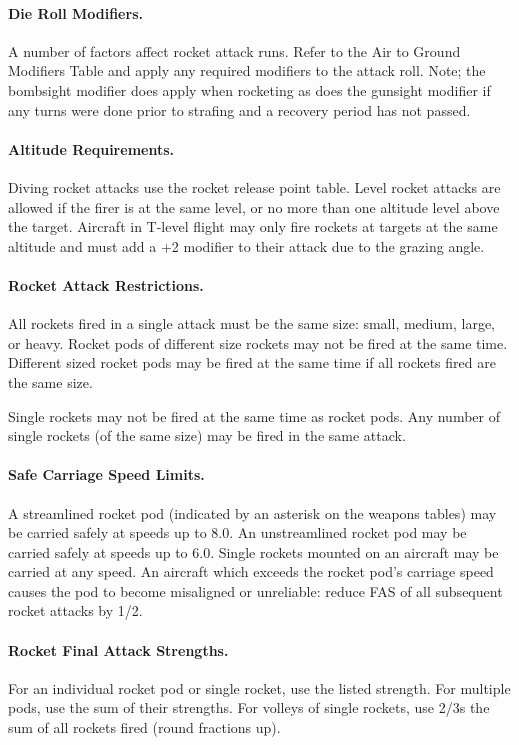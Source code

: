 \paragraph{Die Roll Modifiers.} A number of factors affect rocket attack runs. Refer to the Air to Ground Modifiers Table and apply any required modifiers to the attack roll. Note; the bombsight modifier does apply when rocketing as does the gunsight modifier if any turns were done prior to strafing and a recovery period has not passed.

\paragraph{Altitude Requirements.} Diving rocket attacks use the rocket release point table. Level rocket attacks are allowed if the firer is at the same level, or no more than one altitude level above the target. Aircraft in T-level flight may only fire rockets at targets at the same altitude and must add a +2 modifier to their attack due to the grazing angle.

\paragraph{Rocket Attack Restrictions.} All rockets fired in a single attack must be the same size: small, medium, large, or heavy. Rocket pods of different size rockets may not be fired at the same time. Different sized rocket pods may be fired at the same time if all rockets fired are the same size.

Single rockets may not be fired at the same time as rocket pods. Any number of single rockets (of the same size) may be fired in the same attack.

\paragraph{Safe Carriage Speed Limits.} A streamlined rocket pod (indicated by an asterisk on the weapons tables) may be carried safely at speeds up to 8.0. An unstreamlined rocket pod may be carried safely at speeds up to 6.0. Single rockets mounted on an aircraft may be carried at any speed. An aircraft which exceeds the rocket pod's carriage speed causes the pod to become misaligned or unreliable: reduce FAS of all subsequent rocket attacks by 1/2.

\paragraph{Rocket Final Attack Strengths.} For an individual rocket pod or single rocket, use the listed strength. For multiple pods, use the sum of their strengths. For volleys of single rockets, use 2/3s the sum of all rockets fired (round fractions up).
